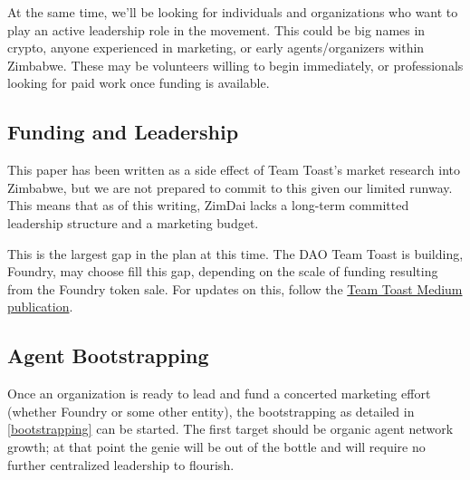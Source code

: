 \documentclass{article}
\begin{document}
At the same time, we'll be looking for individuals and organizations who want to play an active leadership role in the movement. This could be big names in crypto, anyone experienced in marketing, or early agents/organizers within Zimbabwe. These may be volunteers willing to begin immediately, or professionals looking for paid work once funding is available.

\subsection{Funding and Leadership} \label{funding and organization}

This paper has been written as a side effect of Team Toast's market research into Zimbabwe, but we are not prepared to commit to this given our limited runway. This means that as of this writing, ZimDai lacks a long-term committed leadership structure and a marketing budget.

This is the largest gap in the plan at this time. The DAO Team Toast is building, Foundry, may choose fill this gap, depending on the scale of funding resulting from the Foundry token sale. For updates on this, follow the \href{https://medium.com/daihard-buidlers}{Team Toast Medium publication}.

\subsection{Agent Bootstrapping} \label{agent bootstrapping}

Once an organization is ready to lead and fund a concerted marketing effort (whether Foundry or some other entity), the bootstrapping as detailed in \ref{bootstrapping} can be started. The first target should be organic agent network growth; at that point the genie will be out of the bottle and will require no further centralized leadership to flourish.
\end{document}
